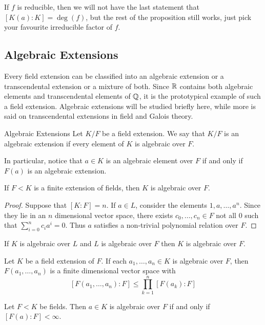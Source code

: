 \documentclass[a4paper]{article}
\begin{document}
If $f$ is reducible, then we will not have the last statement that $[K(a):K]=\deg(f)$, but the rest of the proposition still works, just pick your favourite irreducible factor of $f$. 

\subsection{Algebraic Extensions}
Every field extension can be classified into an algebraic extension or a transcendental extension or a mixture of both. Since $\mathbb{R}$ contains both algebraic elements and transcendental elements of $\mathbb{Q}$, it is the prototypical example of such a field extension. Algebraic extensions will be studied briefly here, while more is said on transcendental extensions in field and Galois theory. 

\begin{defn}{Algebraic Extensions}{} Let $K/F$ be a field extension. We say that $K/F$ is an algebraic extension if every element of $K$ is algebraic over $F$. 
\end{defn}

In particular, notice that $a\in K$ is an algebraic element over $F$ if and only if $F(a)$ is an algebraic extension. 

\begin{lmm}{}{} If $F<K$ is a finite extension of fields, then $K$ is algebraic over $F$. \tcbline
\begin{proof}
Suppose that $[K:F]=n$. If $a\in L$, consider the elements $1,a,\dots,a^n$. Since they lie in an $n$ dimensional vector space, there exists $c_0,\dots,c_n\in F$ not all $0$ such that $\sum_{i=0}^nc_ia^i=0$. Thus $a$ satisfies a non-trivial polynomial relation over $F$. 
\end{proof}
\end{lmm}

\begin{thm}{}{} If $K$ is algebraic over $L$ and $L$ is algebraic over $F$ then $K$ is algebraic over $F$. 
\end{thm}

\begin{prp}{}{} Let $K$ be a field extension of $F$. If each $a_1,\dots,a_n\in K$ is algebraic over $F$, then $F(a_1,\dots,a_n)$ is a finite dimensional vector space with $$[F(a_1,\dots,a_n):F]\leq\prod_{k=1}^n[F(a_k):F]$$
\end{prp}

\begin{crl}{}{} Let $F<K$ be fields. Then $a\in K$ is algebraic over $F$ if and only if $[F(a):F]<\infty$. 
\end{crl}
\end{document}
